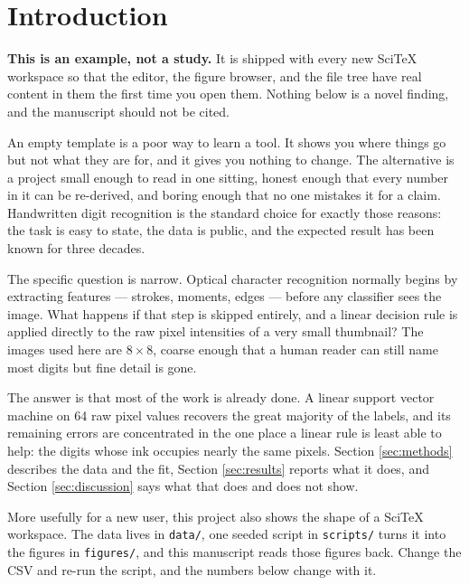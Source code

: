 \section{Introduction}

\textbf{This is an example, not a study.} It is shipped with every new SciTeX
workspace so that the editor, the figure browser, and the file tree have real
content in them the first time you open them. Nothing below is a novel finding,
and the manuscript should not be cited.

An empty template is a poor way to learn a tool. It shows you where things go
but not what they are for, and it gives you nothing to change. The alternative
is a project small enough to read in one sitting, honest enough that every
number in it can be re-derived, and boring enough that no one mistakes it for a
claim. Handwritten digit recognition is the standard choice for exactly those
reasons: the task is easy to state, the data is public, and the expected result
has been known for three decades.

The specific question is narrow. Optical character recognition normally begins
by extracting features --- strokes, moments, edges --- before any classifier
sees the image. What happens if that step is skipped entirely, and a linear
decision rule is applied directly to the raw pixel intensities of a very small
thumbnail? The images used here are $8\times8$, coarse enough that a human
reader can still name most digits but fine detail is gone.

The answer is that most of the work is already done. A linear support vector
machine on 64 raw pixel values recovers the great majority of the labels, and
its remaining errors are concentrated in the one place a linear rule is least
able to help: the digits whose ink occupies nearly the same pixels. Section
\ref{sec:methods} describes the data and the fit, Section \ref{sec:results}
reports what it does, and Section \ref{sec:discussion} says what that does and
does not show.

More usefully for a new user, this project also shows the shape of a SciTeX
workspace. The data lives in \texttt{data/}, one seeded script in
\texttt{scripts/} turns it into the figures in \texttt{figures/}, and this
manuscript reads those figures back. Change the CSV and re-run the script, and
the numbers below change with it.

